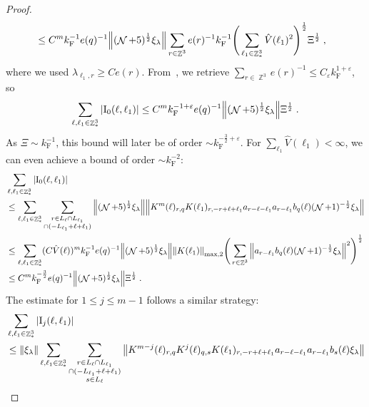 \documentclass[12pt,a4paper]{article}
\numberwithin{equation}{section}
\newcommand{\1}{\mathbb{I}}
\newcommand{\F}{\mathrm{F}}
\newcommand{\I}{\mathrm{I}}
\DeclareMathOperator{\Z}{\mathbb{Z}}
\DeclareMathOperator{\NN}{\mathcal{N}}
\newcommand{\half}{\frac{1}{2}}
\theoremstyle{plain}
\theoremstyle{definition}
\theoremstyle{remark}
\theoremstyle{plain}
\theoremstyle{definition}
\theoremstyle{remark}
\begin{document}
\begin{proof}
{\begin{align}
	 &\leq C^m k_{\F}^{-1} e(q)^{-1}
	 	\norm{ (\NN+5)^{\half} \xi_\lambda}
	 	\sum_{r \in \Z^3} e(r)^{-1} k_{\F}^{-1} \Bigg( \sum_{\ell_1 \in \Z^3_*} \hat{V}(\ell_1)^2 \Bigg)^{\half} \Xi^\half \;,
\end{align}
where we used $ \lambda_{\ell_1,r} \ge C e(r) $. From~\cite[Lemma~3.2]{CHN24}, we retrieve $ \sum_{r \in \Z^3} e(r)^{-1} \le C_\varepsilon k_{\F}^{1+\varepsilon} $, so
\begin{align}
	\sum_{\ell,\ell_1 \in \Z^3_*} |\I_0(\ell, \ell_1)|
	\leq C^m k_{\F}^{-1+\varepsilon} e(q)^{-1}
	 	\norm{ (\NN+5)^{\half} \xi_\lambda}
	 	\Xi^{\half}	\;.
\label{eq:estEQ1121_Coulomb}
\end{align}
As $ \Xi \sim k_{\F}^{-1} $, this bound will later be of order $ \sim k_{\F}^{-\frac 32 + \varepsilon} $. For $ \sum_{\ell_1} \hat{V}(\ell_1) < \infty $, we can even achieve a bound of order $ \sim k_{\F}^{-2} $:
\begin{align}
	&\sum_{\ell,\ell_1 \in \Z^3_*} |\I_0(\ell, \ell_1)| \nonumber\\
	&\leq \sum_{\ell,\ell_1 \in \Z^3_*} \sum\limits_{\substack{r\in L_{\ell} \cap L_{\ell_1}\\ \cap (-L_{\ell_1}+\ell+\ell_1)}} \norm{ (\NN+5)^{\half} \xi_\lambda} \norm{ K^m(\ell )_{r,q} K(\ell_1)_{r,-r+\ell+\ell_1} a_{r-\ell-\ell_1} a_{r-\ell_1} b_{q}(\ell) (\NN+1)^{-\half} \xi_\lambda }\nonumber\\
	 &\leq \sum_{\ell,\ell_1 \in \Z^3_*} (C \hat{V}(\ell))^m k_{\F}^{-1} e(q)^{-1}
	 	\norm{ (\NN+5)^{\half} \xi_\lambda} \norm{K(\ell_1) }_{\max,2}
	 	\Bigg( \sum\limits_{r\in \Z^3} \norm{ a_{r-\ell_1} b_{q}(\ell) (\NN+1)^{-\half} \xi_\lambda }^2 \Bigg)^\half \nonumber\\
	 &\leq C^m
	 	k_{\F}^{-\frac 32} e(q)^{-1}
	 	\norm{(\NN+5)^{\half} \xi_\lambda}
	 	\Xi^{\half} \;.
\label{eq:estEQ1121}
\end{align}
}
The estimate for $ 1 \le j \le m-1 $ follows a similar strategy:
\textcolor{green!30!black}{
\begin{align}
	&\sum_{\ell,\ell_1 \in \Z^3_*} |\I_j(\ell, \ell_1)| \nonumber\\
	&\leq \norm{ \xi_\lambda} \sum_{\ell,\ell_1 \in \Z^3_*} \sum\limits_{\substack{r\in L_{\ell} \cap L_{\ell_1} \\ \cap (-L_{\ell_1} + \ell + \ell_1)\\s\in L_{\ell}}}
		\norm{K^{m-j}(\ell)_{r,q} K^j(\ell)_{q,s} K(\ell_1)_{r,-r+\ell+\ell_1} a_{r-\ell-\ell_1} a_{r-\ell_1} b_{s}(\ell) \xi_\lambda }\nonumber\\

\end{align}}
\end{proof}
\end{document}
